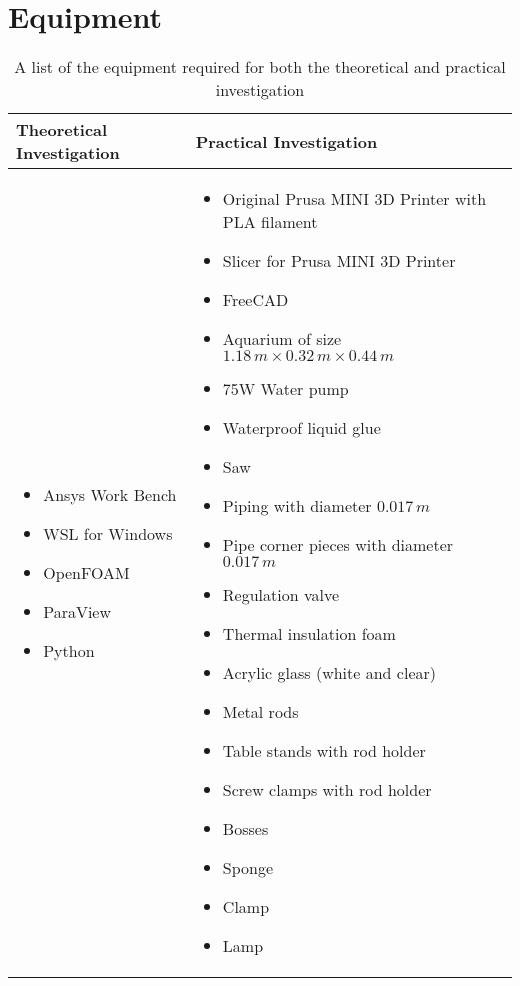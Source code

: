 \section{Equipment}
\begin{table}[H]
	\centering
	\renewcommand{\arraystretch}{1.3}
	\begin{tabularx}{\textwidth}{|X|X|}
		\hline
		\textbf{Theoretical Investigation} & \textbf{Practical Investigation} \\
		\hline
		\begin{itemize}[leftmargin=1.5em, itemsep=2pt, topsep=0pt, label=--]
			\item Ansys Work Bench \parencite{noauthor_ansys_nodate}
			\item WSL for Windows \parencite{noauthor_windows_nodate}
			\item OpenFOAM \parencite{noauthor_openfoam_2024}
			\item ParaView \parencite{noauthor_paraview_nodate}
			\item Python \parencite{noauthor_python_2025}
		\end{itemize} 
		&
		\begin{itemize}[leftmargin=1.5em, itemsep=2pt, topsep=0pt, label=--]
			\item Original Prusa MINI 3D Printer with PLA filament \parencite{noauthor_prusa_nodate}
			\item Slicer for Prusa MINI 3D Printer \parencite{noauthor_prusaslicer_nodate}
			\item FreeCAD \parencite{noauthor_freecad_nodate}
			\item Aquarium of size $ 1.18\,m \times 0.32\,m \times 0.44\,m $
			\item 75W Water pump \parencite{noauthor_lnicez_nodate}
			\item Waterproof liquid glue
			\item Saw
			\item Piping with diameter \diameter $0.017\,m$ 
			\item Pipe corner pieces with diameter \diameter $0.017\,m$ 
			\item Regulation valve
			\item Thermal insulation foam
			\item Acrylic glass (white and clear)
			\item Metal rods
			\item Table stands with rod holder
			\item Screw clamps with rod holder
			\item Bosses
			\item Sponge
			\item Clamp
			\item Lamp
		\end{itemize} \\
		\hline
	\end{tabularx}
	\caption{A list of the equipment required for both the theoretical and practical investigation}
	\label{tab:equipmentList1}
\end{table}

